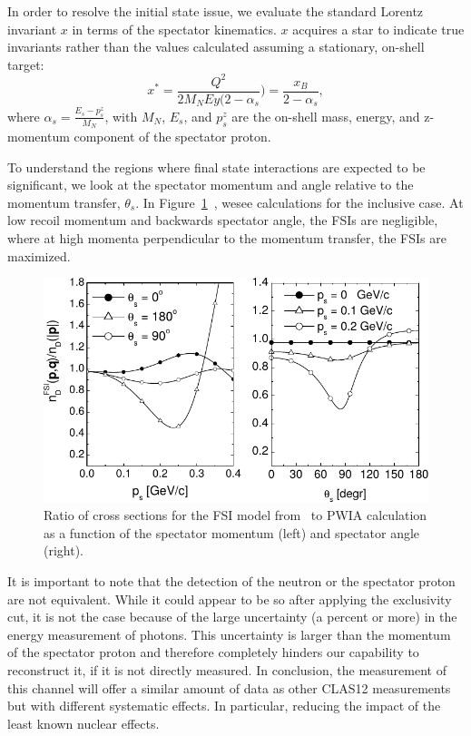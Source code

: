 In order to resolve the initial state issue, we evaluate the standard Lorentz invariant 
$x$ in terms of the spectator kinematics. $x$ acquires a star to indicate  true 
invariants rather than the values calculated assuming a stationary, on-shell 
target:
\begin{equation}
   x^* = \frac{Q^2}{2M_{N}Ey (2-\alpha_s}) = \frac{x_B}{2-\alpha_s},
\end{equation} 
where $\alpha_s = \frac{E_s - p^{z}_{s}}{M_N}$, with $M_N$, $E_s$, and 
$p^{z}_{s}$ are the on-shell mass, energy, and z-momentum component of the 
spectator proton. 

To understand the regions where final state interactions are expected to be significant, we
look at the spectator momentum and angle relative to the momentum transfer, 
$\theta_s$. In 
Figure~\ref{fig:deuteronFSI}~\cite{CiofidegliAtti:2003pb,CiofidegliAtti:2002as}, 
wesee calculations for the inclusive case.  At low recoil momentum and 
backwards spectator angle, the FSIs are negligible, where at high momenta 
perpendicular to the momentum transfer, the FSIs are maximized.

\begin{figure}
   \centering
   \includegraphics{figures/FSI_quasielastic_Atti_2003.pdf}
   \caption{\label{fig:deuteronFSI} Ratio of cross sections for the FSI model 
   from~\cite{CiofidegliAtti:2003pb} to PWIA calculation as a function of
   the spectator momentum (left) and spectator angle (right).}
\end{figure}

It is important to note that the detection of the neutron or the spectator proton are not equivalent.
While it could appear to be so after applying the exclusivity cut, it is not the case because of the 
large uncertainty (a percent or more) in the energy measurement of photons. This uncertainty is larger
than the momentum of the spectator proton and therefore completely hinders our capability to reconstruct
it, if it is not directly measured.
In conclusion, the measurement of this channel will offer a similar amount of data as other 
CLAS12 measurements but with different systematic effects. In particular, reducing the impact
of the least known nuclear effects.

